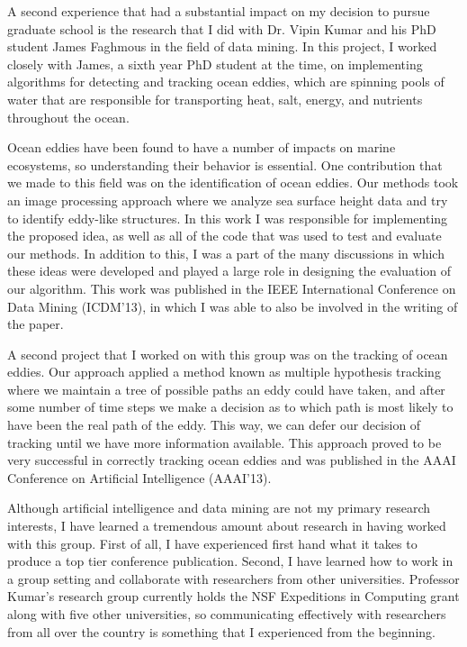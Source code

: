 \documentclass[12pt]{article}
\begin{document}
A second experience that had a substantial impact on my decision to pursue graduate school is the research that I did with Dr. Vipin Kumar and his PhD student James Faghmous in the field of data mining. In this project, I worked closely with James, a sixth year PhD student at the time, on implementing algorithms for detecting and tracking ocean eddies, which are spinning pools of water that are responsible for transporting heat, salt, energy, and nutrients throughout the ocean.

Ocean eddies have been found to have a number of impacts on marine ecosystems, so understanding their behavior is essential. One contribution that we made to this field was on the identification of ocean eddies. Our methods took an image processing approach where we analyze sea surface height data and try to identify eddy-like structures.  In this work I was responsible for implementing the proposed idea, as well as all of the code that was used to test and evaluate our methods. In addition to this, I was a part of the many discussions in which these ideas were developed and played a large role in designing the evaluation of our algorithm. This work was published in the IEEE International Conference on Data Mining (ICDM'13), in which I was able to also be involved in the writing of the paper.

A second project that I worked on with this group was on the tracking of ocean eddies.  Our approach applied a method known as multiple hypothesis tracking where we maintain a tree of possible paths an eddy could have taken, and after some number of time steps we make a decision as to which path is most likely to have been the real path of the eddy. This way, we can defer our decision of tracking until we have more information available. This approach proved to be very successful in correctly tracking ocean eddies and was published in the AAAI Conference on Artificial Intelligence (AAAI'13).

Although artificial intelligence and data mining are not my primary research interests, I have learned a tremendous amount about research in having worked with this group. First of all, I have experienced first hand what it takes to produce a top tier conference publication. Second, I have learned how to work in a group setting and collaborate with researchers from other universities. Professor Kumar's research group currently holds the NSF Expeditions in Computing grant along with five other universities, so communicating effectively with researchers from all over the country is something that I experienced from the beginning.
 
\end{document}
